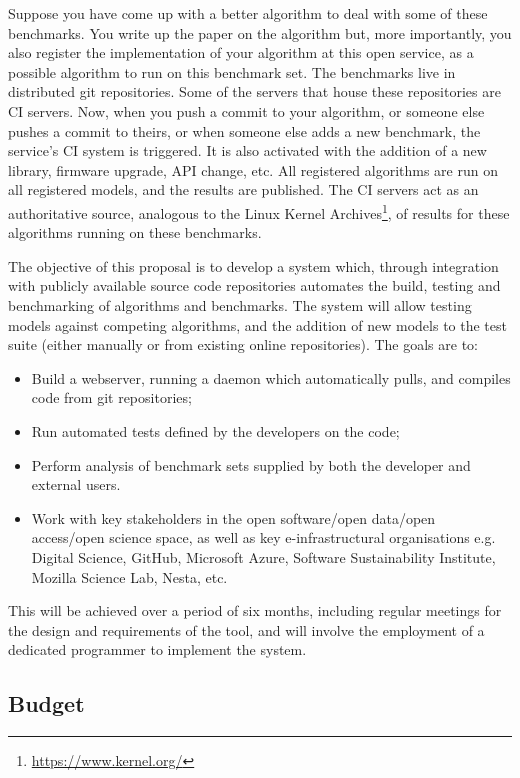 \documentclass[a4paper,11pt]{article}
\begin{document}
Suppose you have come up with a better algorithm to deal with some of
these benchmarks. You write up the paper on the algorithm but, more
importantly, you also register the implementation of your algorithm at
this open service, as a possible algorithm to run on this benchmark
set. The benchmarks live in distributed git 
repositories. Some of the servers that house these repositories are CI
servers. Now, when you push a commit to your algorithm, or someone
else pushes a commit to theirs, or when someone else adds a new
benchmark, the service's CI system is triggered. It is also activated
with the addition of a new library, firmware upgrade, API change,
etc. All registered algorithms are run on all registered models, and
the results are published. The CI servers act as an authoritative
source, analogous to the Linux Kernel
Archives\footnote{\url{https://www.kernel.org/}}, of results for these
algorithms running on these benchmarks.

The objective of this proposal is to develop a system which, through
integration with publicly available source code repositories automates
the build, testing and benchmarking of algorithms and benchmarks. The 
system will allow testing models against competing algorithms, and the
addition of new models to the test suite (either manually or from existing
online repositories). The goals are to:

\begin{itemize}
	\item Build a webserver, running a daemon which automatically pulls, and compiles
code from git repositories;
\item Run automated tests defined by the developers on the code;
\item Perform analysis of benchmark sets supplied by both the developer and external
users.
\item Work with key stakeholders in the open software/open data/open access/open
  science space, as well as key e-infrastructural organisations
  e.g. Digital Science, GitHub, Microsoft
  Azure, Software Sustainability Institute, Mozilla Science Lab,
  Nesta, etc.
\end{itemize}

This will be achieved over a period of six months, including regular
meetings for the design and requirements of the tool, and will involve
the employment of a dedicated programmer to implement the system.


\subsection*{Budget}
\end{document}
